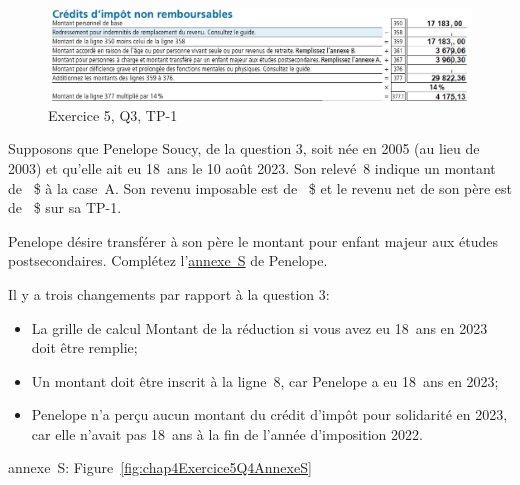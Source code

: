 \begin{figure}
	\centering
	\includegraphics[width=.9\textwidth]{exercice/4-5/Q3/TP-1.png}
	\caption[]{Exercice 5, Q3, TP-1}
	\label{fig:chap4Exercice5Q3TP1}
\end{figure}

\begin{question}
	Supposons que Penelope Soucy, de la question 3, soit née en 2005 (au lieu de 2003) et qu'elle ait eu 18~ans le 10 août 2023. Son relevé~8 indique un montant de ~\$ à la case~A. Son revenu imposable est de ~\$ et le revenu net de son père est de ~\$ sur sa TP-1.
\end{question}
\setcounter{sousQuestion}{0}
\begin{sousQuestion}
	Penelope désire transférer à son père le montant pour enfant majeur aux études postsecondaires. Complétez l'\href{https://www.revenuquebec.ca/documents/fr/formulaires/tp/2023-12/TP-1.D.S%282023-12%29.pdf}{annexe~S} de Penelope.
\end{sousQuestion}
Il y a trois changements par rapport à la question 3:
\begin{itemize}
	\item La grille de calcul \og Montant de la réduction si vous avez eu 18~ans en 2023 \fg{} doit être remplie;
	\item Un montant doit être inscrit à la ligne~8, car Penelope a eu 18~ans en 2023;
	\item Penelope n'a perçu aucun montant du crédit d'impôt pour solidarité en 2023, car elle n'avait pas 18~ans à la fin de l'année d'imposition 2022.
\end{itemize}
annexe~S: Figure~\ref{fig:chap4Exercice5Q4AnnexeS}

